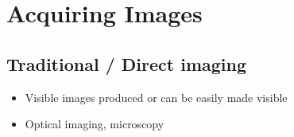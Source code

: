 \documentclass[letterpaper,10pt,english]{sphinxmanual}
\begin{document}
\chapter{Acquiring Images}
\label{\detokenize{01-Introduction:acquiring-images}}

\section{Traditional / Direct imaging}
\label{\detokenize{01-Introduction:traditional-direct-imaging}}\begin{itemize}
\item {} 
\sphinxAtStartPar
Visible images produced or can be easily made visible

\item {} 
\sphinxAtStartPar
Optical imaging, microscopy

\end{itemize}
\end{document}
